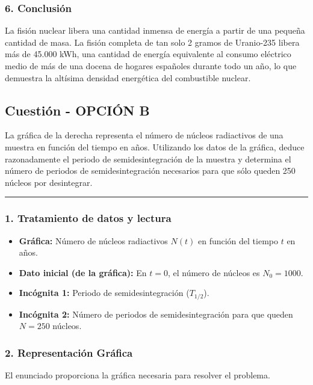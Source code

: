 \subsubsection*{6. Conclusión}
\begin{cajaconclusion}
La fisión nuclear libera una cantidad inmensa de energía a partir de una pequeña cantidad de masa. La fisión completa de tan solo 2 gramos de Uranio-235 libera más de 45.000 kWh, una cantidad de energía equivalente al consumo eléctrico medio de más de una docena de hogares españoles durante todo un año, lo que demuestra la altísima densidad energética del combustible nuclear.
\end{cajaconclusion}
\newpage

\subsection{Cuestión - OPCIÓN B}
\label{subsec:B5B_2017_jun_ord}
\begin{cajaenunciado}
La gráfica de la derecha representa el número de núcleos radiactivos de una muestra en función del tiempo en años. Utilizando los datos de la gráfica, deduce razonadamente el periodo de semidesintegración de la muestra y determina el número de periodos de semidesintegración necesarios para que sólo queden 250 núcleos por desintegrar.
\end{cajaenunciado}
\hrule

\subsubsection*{1. Tratamiento de datos y lectura}
\begin{itemize}
    \item \textbf{Gráfica:} Número de núcleos radiactivos $N(t)$ en función del tiempo $t$ en años.
    \item \textbf{Dato inicial (de la gráfica):} En $t=0$, el número de núcleos es $N_0 = 1000$.
    \item \textbf{Incógnita 1:} Periodo de semidesintegración ($T_{1/2}$).
    \item \textbf{Incógnita 2:} Número de periodos de semidesintegración para que queden $N=250$ núcleos.
\end{itemize}

\subsubsection*{2. Representación Gráfica}
El enunciado proporciona la gráfica necesaria para resolver el problema.

